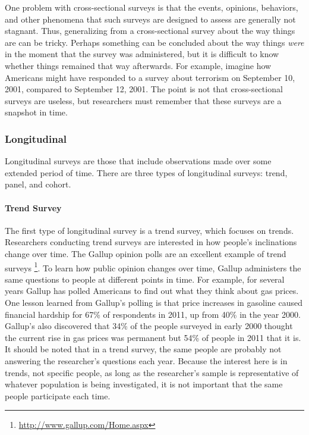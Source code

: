 One problem with cross-sectional surveys is that the events, opinions, behaviors, and other phenomena that such surveys are designed to assess are generally not stagnant. Thus, generalizing from a cross-sectional survey about the way things are can be tricky. Perhaps something can be concluded about the way things \textit{were} in the moment that the survey was administered, but it is difficult to know whether things remained that way afterwards. For example, imagine how Americans might have responded to a survey about terrorism on September 10, 2001, compared to September 12, 2001. The point is not that cross-sectional surveys are useless, but researchers must remember that these surveys are a snapshot in time.

\subsubsection{Longitudinal}

Longitudinal surveys are those that include observations made over some extended period of time. There are three types of longitudinal surveys: trend, panel, and cohort.

\paragraph{Trend Survey}

The first type of longitudinal survey is a trend survey, which focuses on trends. Researchers conducting trend surveys are interested in how people's inclinations change over time. The Gallup opinion polls are an excellent example of trend surveys \footnote{\url{http://www.gallup.com/Home.aspx}}. To learn how public opinion changes over time, Gallup administers the same questions to people at different points in time. For example, for several years Gallup has polled Americans to find out what they think about gas prices. One lesson learned from Gallup's polling is that price increases in gasoline caused financial hardship for 67\% of respondents in 2011, up from 40\% in the year 2000. Gallup's also discovered that 34\% of the people surveyed in early 2000 thought the current rise in gas prices was permanent but 54\% of people in 2011 that it is. It should be noted that in a trend survey, the same people are probably not answering the researcher's questions each year. Because the interest here is in trends, not specific people, as long as the researcher's sample is representative of whatever population is being investigated, it is not important that the same people participate each time.

